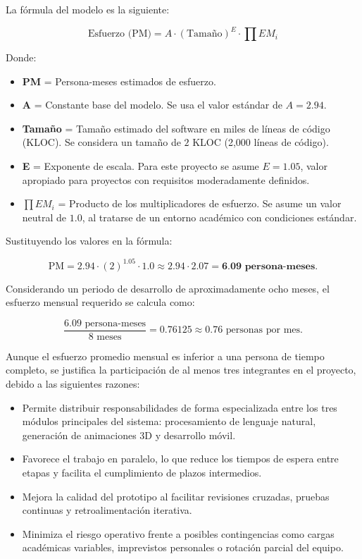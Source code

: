 La fórmula del modelo es la siguiente:

\[
\text{Esfuerzo (PM)} = A \cdot (\text{Tamaño})^E \cdot \prod EM_i
\]

Donde:

\begin{itemize}
	\item \textbf{PM} = Persona-meses estimados de esfuerzo.
	\item \textbf{A} = Constante base del modelo. Se usa el valor estándar de $A = 2.94$.
	\item \textbf{Tamaño} = Tamaño estimado del software en miles de líneas de código (KLOC). Se considera un tamaño de $2$ KLOC (2,000 líneas de código).
	\item \textbf{E} = Exponente de escala. Para este proyecto se asume $E = 1.05$, valor apropiado para proyectos con requisitos moderadamente definidos.
	\item $\prod EM_i$ = Producto de los multiplicadores de esfuerzo. Se asume un valor neutral de $1.0$, al tratarse de un entorno académico con condiciones estándar.
\end{itemize}

Sustituyendo los valores en la fórmula:

\[
\text{PM} = 2.94 \cdot (2)^{1.05} \cdot 1.0 \approx 2.94 \cdot 2.07 = \textbf{6.09 persona-meses.}
\]

Considerando un periodo de desarrollo de aproximadamente ocho meses, el esfuerzo mensual requerido se calcula como:

\[
\frac{6.09 \text{ persona-meses}}{8 \text{ meses}} = \num{0.76125} \approx \num{0.76} \text{ personas por mes.}
\]

Aunque el esfuerzo promedio mensual es inferior a una persona de tiempo completo, se justifica la participación de al menos tres integrantes en el proyecto, debido a las siguientes razones:

\begin{itemize}
	\item Permite distribuir responsabilidades de forma especializada entre los tres módulos principales del sistema: procesamiento de lenguaje natural, generación de animaciones 3D y desarrollo móvil.
	\item Favorece el trabajo en paralelo, lo que reduce los tiempos de espera entre etapas y facilita el cumplimiento de plazos intermedios.
	\item Mejora la calidad del prototipo al facilitar revisiones cruzadas, pruebas continuas y retroalimentación iterativa.
	\item Minimiza el riesgo operativo frente a posibles contingencias como cargas académicas variables, imprevistos personales o rotación parcial del equipo.
\end{itemize}


